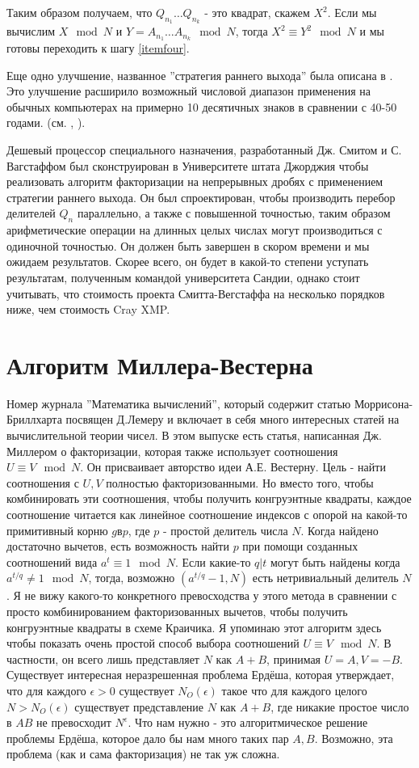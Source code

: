 \documentclass[a4paper,12pt]{report}
\newcommand{\sus }{$U \equiv V \mod N$}
\begin{document}
Таким образом получаем, что $Q_{n_1} \ldots Q_{n_k}$ - это квадрат, скажем $X^2$. Если мы вычислим $X \mod{N}$ и $Y = A_{n_1} \ldots A_{n_k} \mod N$, тогда $X^2 \equiv Y^2 \mod N$ и мы готовы переходить к шагу \ref{itemfour}.

Еще одно улучшение, названное ''стратегия раннего выхода'' была описана в \cite{pomer}. Это улучшение расширило возможный числовой диапазон применения на обычных компьютерах на примерно 10 десятичных знаков в сравнении с 40-50 годами. (см. \cite{wunder}, \cite{wags}).

Дешевый процессор специального назначения, разработанный Дж. Смитом и С. Вагстаффом был сконструирован в Университете штата Джорджия чтобы реализовать алгоритм факторизации на непрерывных дробях с применением стратегии раннего выхода. Он был спроектирован, чтобы производить перебор делителей $Q_n$ параллельно, а также с повышенной точностью, таким образом арифметические операции на длинных целых числах могут производиться с одиночной точностью. Он должен быть завершен в скором времени и мы ожидаем результатов. Скорее всего, он будет в какой-то степени уступать результатам, полученным командой университета Сандии, однако стоит учитывать, что стоимость проекта Смитта-Вегстаффа на несколько порядков ниже, чем стоимость Cray XMP.

\section{Алгоритм Миллера-Вестерна}
Номер журнала ''Математика вычислений'', который содержит статью Моррисона-Бриллхарта посвящен Д.Лемеру и включает в себя много интересных статей на вычислительной теории чисел. В этом выпуске есть статья, написанная Дж. Миллером \cite{miller} о факторизации, которая также использует соотношения \sus . Он присваивает авторство идеи А.Е. Вестерну. Цель - найти соотношения с $U, V$ полностью факторизованными. Но вместо того, чтобы комбинировать эти соотношения, чтобы получить конгруэнтные квадраты, каждое соотношение читается как линейное соотношение индексов с опорой на какой-то примитивный корню $g в p$, где $p$ - простой делитель числа $N$. Когда найдено достаточно вычетов, есть возможность найти $p$ при помощи созданных соотношений вида $a^t \equiv 1 \mod N$. Если какие-то $q|t$ могут быть найдены когда $a^{t/q} \neq 1 \mod N$, тогда, возможно $(a^{t/q}-1, N)$ есть нетривиальный делитель $N$.
Я не вижу какого-то конкретного превосходства у этого метода в сравнении с просто комбинированием факторизованных вычетов, чтобы получить конгруэнтные квадраты в схеме Краичика. Я упоминаю этот алгоритм здесь чтобы показать очень простой способ выбора соотношений \sus . В частности, он всего лишь представляет $N$ как $A+B$, принимая $U = A, V = -B$. Существует интересная неразрешенная проблема Ердёша, которая утверждает, что для каждого $\epsilon > 0$ существует $N_{O}(\epsilon)$ такое что для каждого целого $N > N_{O}(\epsilon)$ существует представление $N$ как $A+B$, где никакие простое число в $AB$ не превосходит $N^{\epsilon}$. Что нам нужно - это алгоритмическое решение проблемы Ердёша, которое дало бы нам много таких пар $A, B$. Возможно, эта проблема (как и сама факторизация) не так уж сложна.
\end{document}
